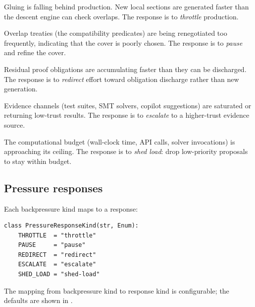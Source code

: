 \documentclass[11pt]{article}
\begin{document}
\begin{description}[style=nextline, leftmargin=0pt]
\item[\texttt{INTEGRATION\_LAG}:]
  Gluing is falling behind production.  New local sections are generated
  faster than the descent engine can check overlaps.  The response is to
  \emph{throttle} production.

\item[\texttt{TREATY\_INSTABILITY}:]
  Overlap treaties (the compatibility predicates) are being renegotiated
  too frequently, indicating that the cover is poorly chosen.  The response
  is to \emph{pause} and refine the cover.

\item[\texttt{OBLIGATION\_OVERFLOW}:]
  Residual proof obligations are accumulating faster than they can be
  discharged.  The response is to \emph{redirect} effort toward obligation
  discharge rather than new generation.

\item[\texttt{EVIDENCE\_EXHAUSTION}:]
  Evidence channels (test suites, SMT solvers, copilot suggestions) are
  saturated or returning low-trust results.  The response is to
  \emph{escalate} to a higher-trust evidence source.

\item[\texttt{BUDGET\_CRITICAL}:]
  The computational budget (wall-clock time, API calls, solver invocations)
  is approaching its ceiling.  The response is to \emph{shed load}: drop
  low-priority proposals to stay within budget.
\end{description}

\subsection{Pressure responses}

Each backpressure kind maps to a response:

\begin{lstlisting}[caption={Pressure response kinds.},label={lst:response}]
class PressureResponseKind(str, Enum):
    THROTTLE  = "throttle"
    PAUSE     = "pause"
    REDIRECT  = "redirect"
    ESCALATE  = "escalate"
    SHED_LOAD = "shed-load"
\end{lstlisting}

\noindent
The mapping from backpressure kind to response kind is configurable; the
defaults are shown in .
\end{document}
